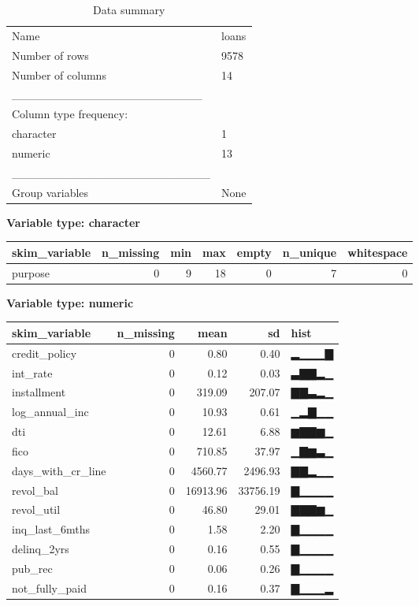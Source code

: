 \documentclass[
]{article}
\begin{document}
\begin{longtable}[]{@{}ll@{}}
\caption{Data summary}\tabularnewline
\toprule
\endhead
Name & loans \\
Number of rows & 9578 \\
Number of columns & 14 \\
\_\_\_\_\_\_\_\_\_\_\_\_\_\_\_\_\_\_\_\_\_\_\_ & \\
Column type frequency: & \\
character & 1 \\
numeric & 13 \\
\_\_\_\_\_\_\_\_\_\_\_\_\_\_\_\_\_\_\_\_\_\_\_\_ & \\
Group variables & None \\
\bottomrule
\end{longtable}

\textbf{Variable type: character}

\begin{longtable}[]{@{}lrrrrrr@{}}
\toprule
skim\_variable & n\_missing & min & max & empty & n\_unique &
whitespace \\
\midrule
\endhead
purpose & 0 & 9 & 18 & 0 & 7 & 0 \\
\bottomrule
\end{longtable}

\textbf{Variable type: numeric}

\begin{longtable}[]{@{}lrrrl@{}}
\toprule
skim\_variable & n\_missing & mean & sd & hist \\
\midrule
\endhead
credit\_policy & 0 & 0.80 & 0.40 & ▂▁▁▁▇ \\
int\_rate & 0 & 0.12 & 0.03 & ▃▇▇▂▁ \\
installment & 0 & 319.09 & 207.07 & ▇▇▃▂▁ \\
log\_annual\_inc & 0 & 10.93 & 0.61 & ▁▂▇▁▁ \\
dti & 0 & 12.61 & 6.88 & ▆▇▇▆▁ \\
fico & 0 & 710.85 & 37.97 & ▁▇▆▃▁ \\
days\_with\_cr\_line & 0 & 4560.77 & 2496.93 & ▇▇▂▁▁ \\
revol\_bal & 0 & 16913.96 & 33756.19 & ▇▁▁▁▁ \\
revol\_util & 0 & 46.80 & 29.01 & ▇▇▇▆▁ \\
inq\_last\_6mths & 0 & 1.58 & 2.20 & ▇▁▁▁▁ \\
delinq\_2yrs & 0 & 0.16 & 0.55 & ▇▁▁▁▁ \\
pub\_rec & 0 & 0.06 & 0.26 & ▇▁▁▁▁ \\
not\_fully\_paid & 0 & 0.16 & 0.37 & ▇▁▁▁▂ \\
\bottomrule
\end{longtable}
\end{document}
